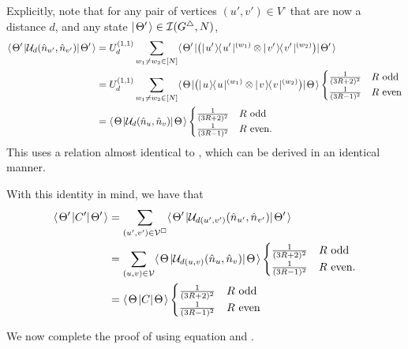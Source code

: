 \documentclass[../thesis-main/thesis-main]{subfiles}
\begin{document}
Explicitly, note that for any pair of vertices $(u',v')\in V^\square$ that are now a distance $d$, and any state $|\mspace{2mu} \Theta' \mspace{2mu} \rangle \in \mathcal{I}(G^\triangle,N)$,
\begin{align}
  \langle\mspace{2mu} \Theta' \mspace{2mu} |\mathcal{U}_d(\hat{n}_{u'},\hat{n}_{v'}) |\mspace{2mu} \Theta' \mspace{2mu} \rangle &= U_{d}^{(1,1)}\sum_{w_1\neq w_2\in[N]} \langle\mspace{2mu} \Theta' \mspace{2mu} |\big(|\mspace{2mu} u' \mspace{2mu} \rangle\mspace{-2mu}\langle\mspace{2mu} u' \mspace{2mu} |^{(w_1)} \otimes |\mspace{2mu} v' \mspace{2mu} \rangle\mspace{-2mu}\langle\mspace{2mu} v' \mspace{2mu} |^{(w_2)}\big) |\mspace{2mu} \Theta' \mspace{2mu} \rangle\\
  & =U_{d}^{(1,1)}\sum_{w_1\neq w_2\in[N]} \langle\mspace{2mu} \Theta \mspace{2mu} |\big(|\mspace{2mu} u \mspace{2mu} \rangle\mspace{-2mu}\langle\mspace{2mu} u \mspace{2mu} |^{(w_1)} \otimes |\mspace{2mu} v \mspace{2mu} \rangle\mspace{-2mu}\langle\mspace{2mu} v \mspace{2mu} |^{(w_2)}\big) |\mspace{2mu} \Theta \mspace{2mu} \rangle \begin{cases}
       \frac{1}{(3R+2)^2} & R\text{ odd}\\
       \frac{1}{(3R-1)^2} & R\text{ even}
    \end{cases}\\
  &= \langle\mspace{2mu} \Theta \mspace{2mu} | \mathcal{U}_d( \hat{n}_u,\hat{n}_v) |\mspace{2mu} \Theta \mspace{2mu} \rangle\begin{cases}
       \frac{1}{(3R+2)^2} & R\text{ odd}\\
       \frac{1}{(3R-1)^2} & R\text{ even}.
    \end{cases}
\end{align}
This uses a relation almost identical to , which can be derived in an identical manner.

With this identity in mind, we have that 
\begin{align}
  \langle\mspace{2mu} \Theta' \mspace{2mu} | C' |\mspace{2mu} \Theta' \mspace{2mu} \rangle &= \sum_{(u',v')\in \mathcal{V}^\square} \langle\mspace{2mu} \Theta' \mspace{2mu} |\mathcal{U}_{d(u',v')}(\hat{n}_{u'},\hat{n}_{v'}) |\mspace{2mu} \Theta' \mspace{2mu} \rangle \\
   &= \sum_{(u,v)\in \mathcal{V}} \langle\mspace{2mu} \Theta \mspace{2mu} | \mathcal{U}_{d(u,v)}( \hat{n}_u,\hat{n}_v) |\mspace{2mu} \Theta \mspace{2mu} \rangle\begin{cases}
       \frac{1}{(3R+2)^2} & R\text{ odd}\\
       \frac{1}{(3R-1)^2} & R\text{ even}.
    \end{cases}\\
  &= \langle\mspace{2mu} \Theta \mspace{2mu} | C |\mspace{2mu} \Theta \mspace{2mu} \rangle \begin{cases}
       \frac{1}{(3R+2)^2} & R\text{ odd}\\
       \frac{1}{(3R-1)^2} & R\text{ even}
    \end{cases}
    \label{eq:C' relation}
\end{align}

We now complete the proof of  using equation  and .

\end{document}

